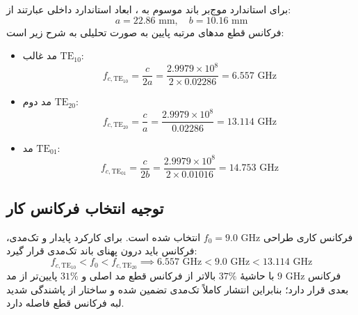 \documentclass[11pt,a4paper]{article}
\begin{document}
برای استاندارد موج‌بر باند  موسوم به ، ابعاد استاندارد داخلی عبارتند از:
\begin{equation}
a = 22.86\text{ mm}, \quad b = 10.16\text{ mm}
\end{equation}
فرکانس قطع مدهای مرتبه پایین به صورت تحلیلی به شرح زیر است:
\begin{itemize}
    \item مد غالب $\text{TE}_{10}$:
    \begin{equation}
    f_{c,\text{TE}_{10}} = \frac{c}{2a} = \frac{2.9979 \times 10^8}{2 \times 0.02286} = 6.557\text{ GHz}
    \end{equation}
    \item مد دوم $\text{TE}_{20}$:
    \begin{equation}
    f_{c,\text{TE}_{20}} = \frac{c}{a} = \frac{2.9979 \times 10^8}{0.02286} = 13.114\text{ GHz}
    \end{equation}
    \item مد $\text{TE}_{01}$:
    \begin{equation}
    f_{c,\text{TE}_{01}} = \frac{c}{2b} = \frac{2.9979 \times 10^8}{2 \times 0.01016} = 14.753\text{ GHz}
    \end{equation}
\end{itemize}

\subsection{توجیه انتخاب فرکانس کار }
فرکانس کاری طراحی $f_0 = 9.0\text{ GHz}$ انتخاب شده است. برای کارکرد پایدار و تک‌مدی، فرکانس باید درون پهنای باند تک‌مدی  قرار گیرد:
\begin{equation}
f_{c,\text{TE}_{10}} < f_0 < f_{c,\text{TE}_{20}} \implies 6.557\text{ GHz} < 9.0\text{ GHz} < 13.114\text{ GHz}
\end{equation}
فرکانس $9\text{ GHz}$ با حاشیهٔ $37\%$ بالاتر از فرکانس قطع مد اصلی و $31\%$ پایین‌تر از مد بعدی قرار دارد؛ بنابراین انتشار کاملاً تک‌مدی تضمین شده و ساختار از پاشندگی شدید لبه فرکانس قطع فاصله دارد.
\end{document}
